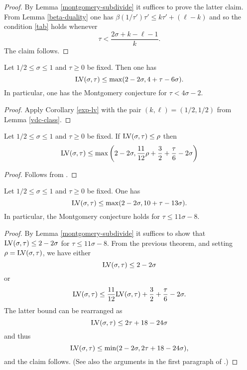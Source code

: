 \begin{proof}  By Lemma \ref{montgomery-subdivide} it suffices to prove the latter claim.  From Lemma \ref{beta-duality} one has
    $\beta(1/\tau') \tau' \leq k \tau' + (\ell-k)$
and so the condition \eqref{tab} holds whenever
$$ \tau < \frac{2\sigma+k-\ell-1}{k}.$$
The claim follows.
\end{proof}

\begin{theorem}\label{huxley-lv}\cite[Equation~(2.9)]{Huxley} Let $1/2 \leq \sigma \leq 1$ and $\tau \geq 0$ be fixed.  Then one has
    $$ \mathrm{LV}(\sigma,\tau) \leq \max( 2-2\sigma, 4 + \tau - 6 \sigma).$$
    In particular, one has the Montgomery conjecture for $\tau < 4 \sigma - 2$.
\end{theorem}

\begin{proof}  Apply Corollary \ref{exp-lv} with the pair $(k,\ell) = (1/2,1/2)$ from Lemma \ref{vdc-class}.
\end{proof}





\begin{theorem}\label{heath_brown-lv-prelim} Let $1/2 \leq \sigma \leq 1$ and $\tau \geq 0$ be fixed.  If $\mathrm{LV}(\sigma, \tau) \le \rho$ then
    \[
    \mathrm{LV}(\sigma, \tau) \le \max\left(2 - 2\sigma, \frac{11}{12}\rho + \frac{3}{2} + \frac{\tau}{6} - 2\sigma\right)
    \]
    \end{theorem}

    \begin{proof}
    Follows from \cite[Lemma~1]{heathbrown_zero_1979}.
    \end{proof}

\begin{theorem}\label{hb-opt} Let $1/2 \leq \sigma \leq 1$ and $\tau \geq 0$ be fixed.   One has
    $$ \mathrm{LV}(\sigma,\tau) \leq \max( 2-2\sigma, 10 + \tau - 13 \sigma).$$
In particular, the Montgomery conjecture holds for $\tau \leq 11 \sigma - 8$.
\end{theorem}

\begin{proof}  By Lemma \ref{montgomery-subdivide} it suffices to show that $\mathrm{LV}(\sigma,\tau) \leq 2-2\sigma$ for $\tau \leq 11\sigma-8$.  From the previous theorem, and setting $\rho = \mathrm{LV}(\sigma,\tau)$, we have either
$$ \mathrm{LV}(\sigma,\tau) \leq 2-2\sigma$$
or
$$ \mathrm{LV}(\sigma,\tau) \leq \frac{11}{12}\mathrm{LV}(\sigma,\tau) + \frac{3}{2} + \frac{\tau}{6} - 2\sigma.$$
The latter bound can be rearranged as
$$ \mathrm{LV}(\sigma,\tau) \leq 2\tau + 18 - 24\sigma$$
and thus
$$ \mathrm{LV}(\sigma,\tau) \leq \min( 2-2\sigma, 2\tau + 18 - 24\sigma),$$
and the claim follows.  (See also the arguments in the first paragraph of \cite[p. 226]{heathbrown_zero_1979}.)
\end{proof}


